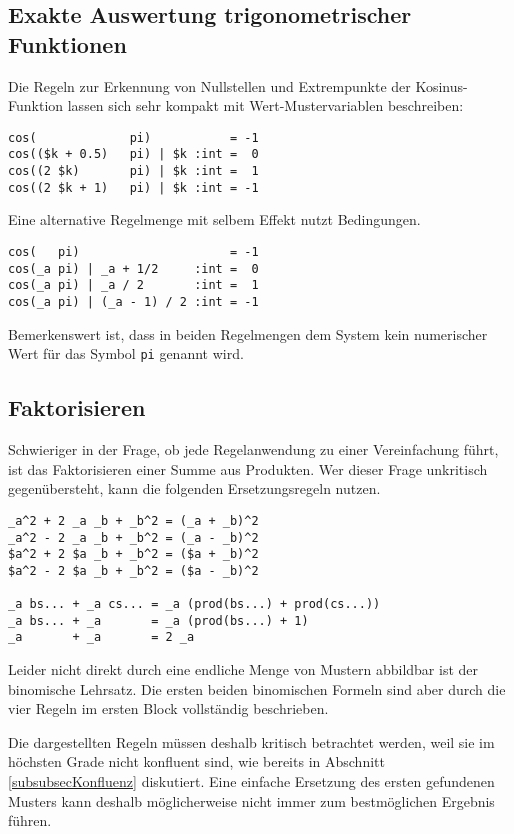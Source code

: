 \subsection{Exakte Auswertung trigonometrischer Funktionen}
Die Regeln zur Erkennung von Nullstellen und Extrempunkte der Kosinus-Funktion lassen sich sehr kompakt mit Wert-Mustervariablen beschreiben: 

\begin{verbatim}
cos(             pi)           = -1
cos(($k + 0.5)   pi) | $k :int =  0
cos((2 $k)       pi) | $k :int =  1
cos((2 $k + 1)   pi) | $k :int = -1
\end{verbatim}

Eine alternative Regelmenge mit selbem Effekt nutzt Bedingungen.

\begin{verbatim}
cos(   pi)                     = -1
cos(_a pi) | _a + 1/2     :int =  0
cos(_a pi) | _a / 2       :int =  1
cos(_a pi) | (_a - 1) / 2 :int = -1
\end{verbatim}

Bemerkenswert ist, dass in beiden Regelmengen dem System kein numerischer Wert für das Symbol \verb|pi| genannt wird.

\subsection{Faktorisieren}
Schwieriger in der Frage, ob jede Regelanwendung zu einer Vereinfachung führt, ist das Faktorisieren einer Summe aus Produkten. Wer dieser Frage unkritisch gegenübersteht, kann die folgenden Ersetzungsregeln nutzen.

\begin{verbatim}
_a^2 + 2 _a _b + _b^2 = (_a + _b)^2
_a^2 - 2 _a _b + _b^2 = (_a - _b)^2
$a^2 + 2 $a _b + _b^2 = ($a + _b)^2
$a^2 - 2 $a _b + _b^2 = ($a - _b)^2

_a bs... + _a cs... = _a (prod(bs...) + prod(cs...))
_a bs... + _a       = _a (prod(bs...) + 1)
_a       + _a       = 2 _a
\end{verbatim}

Leider nicht direkt durch eine endliche Menge von Mustern abbildbar ist der binomische Lehrsatz. Die ersten beiden binomischen Formeln sind aber durch die vier Regeln im ersten Block vollständig beschrieben.

Die dargestellten Regeln müssen deshalb kritisch betrachtet werden, weil sie im höchsten Grade nicht konfluent sind, wie bereits in Abschnitt \ref{subsubsecKonfluenz} diskutiert. Eine einfache Ersetzung des ersten gefundenen Musters kann deshalb möglicherweise nicht immer zum bestmöglichen Ergebnis führen.

















